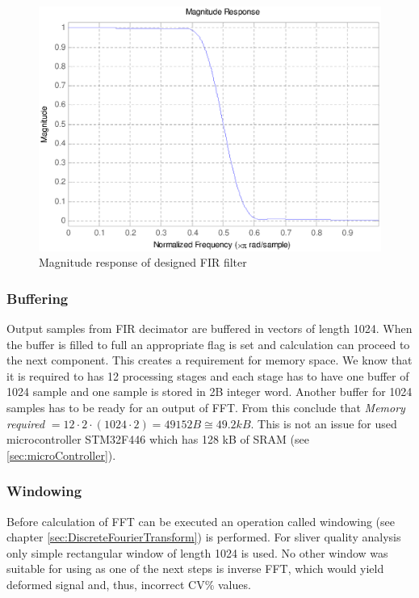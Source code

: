 \documentclass[twoside]{ctuthesis}
\theoremstyle{plain}
\theoremstyle{definition}
\theoremstyle{note}
\begin{document}
\begin{figure}[h]
	\centering
	\includegraphics[width=1.0\textwidth]{magnitudeResponse.eps}
	\caption{Magnitude response of designed FIR filter}
	\label{fig:MagnitudeResponse}
\end{figure}

\subsubsection{Buffering}
Output samples from FIR decimator are buffered in vectors of length 1024. When the buffer is filled to full an appropriate flag is set and calculation can proceed to the next component. This creates a requirement for memory space. We know that it is required to has 12 processing stages and each stage has to have one buffer of 1024 sample and one sample is stored in 2B integer word. Another buffer for 1024 samples has to be ready for an output of FFT. From this conclude that \textit{Memory required} $= 12 \cdot 2 \cdot(1024 \cdot 2)=49152B\cong49.2kB$. This is not an issue for used microcontroller STM32F446 which has 128 kB of SRAM (see \ref{sec:microController}).

\subsubsection{Windowing}
Before calculation of FFT can be executed an operation called windowing (see chapter \ref{sec:DiscreteFourierTransform}) is performed. For sliver quality analysis only simple rectangular window of length 1024 is used. No other window was suitable for using as one of the next steps is inverse FFT, which would yield deformed signal and, thus, incorrect CV\% values.
\end{document}
